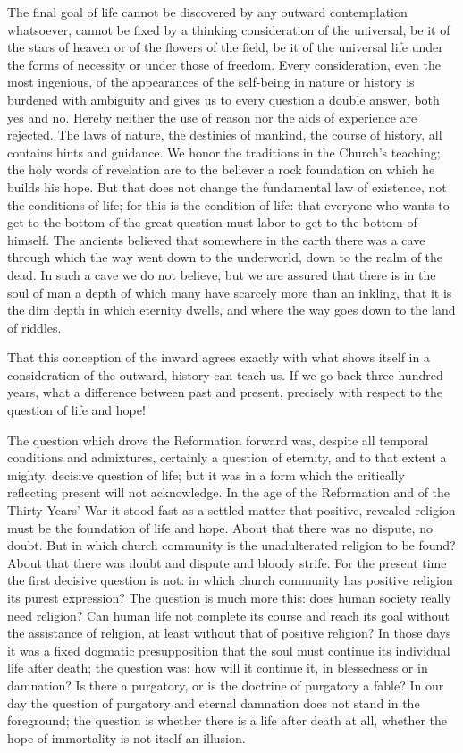 \documentclass[12pt,a4paper,openany]{book}
\newcommand{\opage}[1]{\marginnote{\footnotesize\textit{[#1]}}}
\begin{document}
The final goal of life cannot be discovered by any outward contemplation whatsoever, cannot be fixed
by a thinking consideration of the universal, be it of the stars of heaven or of the flowers of the
field, be it of the universal life under the forms of necessity or under those of freedom. Every
consideration, even the most ingenious, of the appearances of the self-being in nature or history
is burdened with ambiguity and gives us to every question a double answer, both yes and no. Hereby
neither the use of reason nor the aids of experience are rejected. The laws of nature, the destinies
of mankind, the course of history, all contains hints and guidance. We honor the traditions in the
Church's teaching; the
\setcounter{footnote}{0}%
\opage{12}holy words of revelation are to the believer a rock foundation on which he builds his hope.
But that does not change the fundamental law of existence, not the conditions of life; for this is
the condition of life: that everyone who wants to get to the bottom of the great question must labor
to get to the bottom of himself. The ancients believed that somewhere in the earth there was a cave
through which the way went down to the underworld, down to the realm of the dead. In such a cave we
do not believe, but we are assured that there is in the soul of man a depth of which many have
scarcely more than an inkling, that it is the dim depth in which eternity dwells, and where the way
goes down to the land of riddles.

That this conception of the inward agrees exactly with what shows itself in a consideration of the
outward, history can teach us. If we go back three hundred years, what a difference between past and
present, precisely with respect to the question of life and hope!

The question which drove the Reformation forward was, despite all temporal conditions and
admixtures, certainly a question of eternity, and to that extent a mighty, decisive question of
life; but it was in a form which the critically reflecting present will not acknowledge. In the age
of the Reformation and of the Thirty Years' War it stood fast as a settled matter that positive,
revealed religion must be the foundation of life and hope. About that there was no dispute, no
doubt. But in which church community is the unadulterated religion to be found? About that there was
doubt and dispute and bloody strife. For the present time the first decisive question is not: in
which church community has positive religion its purest expression? The question is much
\setcounter{footnote}{0}%
\opage{13}more this: does human society really need religion? Can human life not complete its course and
reach its goal without the assistance of religion, at least without that of positive religion? In
those days it was a fixed dogmatic presupposition that the soul must continue its individual life
after death; the question was: how will it continue it, in blessedness or in damnation? Is there a
purgatory, or is the doctrine of purgatory a fable? In our day the question of purgatory and eternal
damnation does not stand in the foreground; the question is whether there is a life after death at
all, whether the hope of immortality is not itself an illusion.
\end{document}
